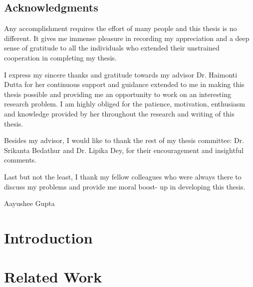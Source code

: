 \documentclass[letterpaper,11pt]{report}
\begin{document}
\newpage
\pagestyle{empty}


\newpage



\section*{Acknowledgments}\label{section:acknowledgments}
\pagestyle{plain}

Any accomplishment requires the effort of many people and this thesis is no different. It gives me immense pleasure in recording my appreciation and a deep sense of gratitude to all the individuals who extended their unstrained cooperation in completing my thesis.

I express my sincere thanks and gratitude towards my advisor Dr. Haimonti Dutta for her continuous support and guidance extended to me in making this thesis possible and providing me an opportunity to work on an interesting research problem. I am highly obliged for the patience, motivation, enthusiasm and knowledge provided by her throughout the research and writing of this thesis.

Besides my advisor, I would like to thank the rest of my thesis committee: Dr. Srikanta Bedathur and Dr. Lipika Dey, for their encouragement and insightful comments.

Last but not the least, I thank my fellow colleagues who were always there to discuss my problems and provide me moral boost- up in developing this thesis.\\ \vspace{0.2in}

Aayushee Gupta

\newpage

\tableofcontents
\listoffigures 
\listoftables

\newpage

\newpage

\newpage
\mbox{}



\chapter{Introduction}\label{chapter:introduction}
\setcounter{page}{1}
\onehalfspacing
 

\chapter{Related Work}
\end{document}
